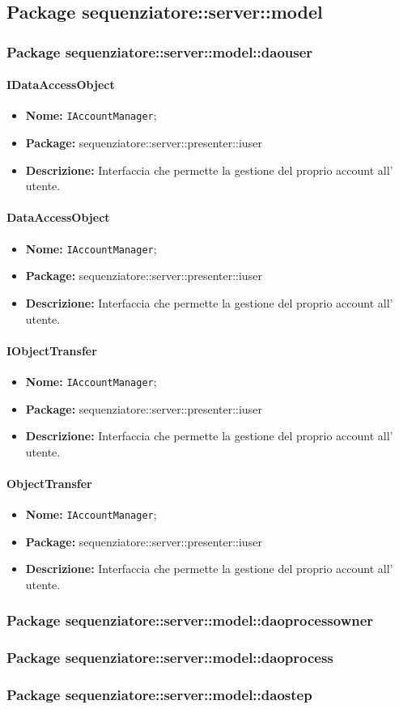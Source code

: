\subsection{Package sequenziatore::server::model}
\subsubsection{Package sequenziatore::server::model::daouser}
\paragraph{IDataAccessObject}
	\begin{itemize}
		\item \textbf{Nome:} \texttt{IAccountManager};
		\item \textbf{Package:} sequenziatore::server::presenter::iuser
		\item \textbf{Descrizione:} Interfaccia che permette la gestione del proprio account all' utente.
	\end{itemize}
\paragraph{DataAccessObject}
	\begin{itemize}
		\item \textbf{Nome:} \texttt{IAccountManager};
		\item \textbf{Package:} sequenziatore::server::presenter::iuser
		\item \textbf{Descrizione:} Interfaccia che permette la gestione del proprio account all' utente.
	\end{itemize}
\paragraph{IObjectTransfer}
	\begin{itemize}
		\item \textbf{Nome:} \texttt{IAccountManager};
		\item \textbf{Package:} sequenziatore::server::presenter::iuser
		\item \textbf{Descrizione:} Interfaccia che permette la gestione del proprio account all' utente.
	\end{itemize}
\paragraph{ObjectTransfer}
	\begin{itemize}
		\item \textbf{Nome:} \texttt{IAccountManager};
		\item \textbf{Package:} sequenziatore::server::presenter::iuser
		\item \textbf{Descrizione:} Interfaccia che permette la gestione del proprio account all' utente.
	\end{itemize}
\subsubsection{Package sequenziatore::server::model::daoprocessowner}
\subsubsection{Package sequenziatore::server::model::daoprocess}
\subsubsection{Package sequenziatore::server::model::daostep}
